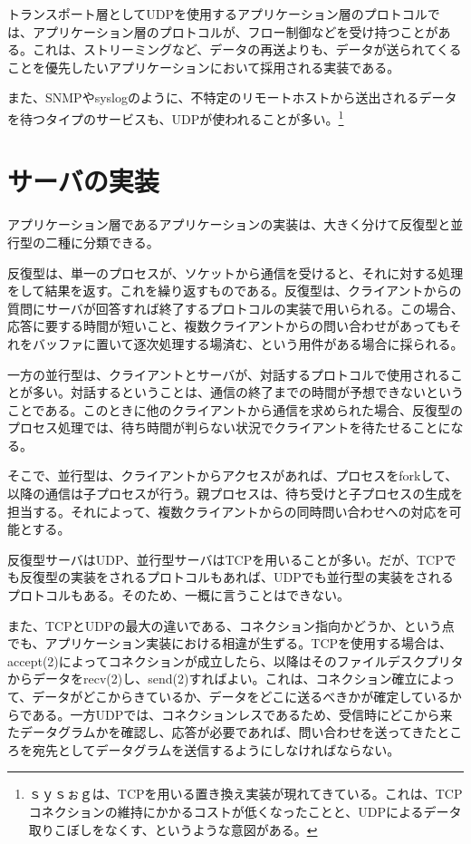 トランスポート層としてUDPを使用するアプリケーション層のプロトコルでは、アプリケーション層のプロトコルが、フロー制御などを受け持つことがある。これは、ストリーミングなど、データの再送よりも、データが送られてくることを優先したいアプリケーションにおいて採用される実装である。

また、SNMPやsyslogのように、不特定のリモートホストから送出されるデータを待つタイプのサービスも、UDPが使われることが多い。\footnote{ｓｙｓぉｇは、TCPを用いる置き換え実装が現れてきている。これは、TCPコネクションの維持にかかるコストが低くなったことと、UDPによるデータ取りこぼしをなくす、というような意図がある。}

\section{サーバの実装}
アプリケーション層であるアプリケーションの実装は、大きく分けて反復型と並行型の二種に分類できる。

反復型は、単一のプロセスが、ソケットから通信を受けると、それに対する処理をして結果を返す。これを繰り返すものである。反復型は、クライアントからの質問にサーバが回答すれば終了するプロトコルの実装で用いられる。この場合、応答に要する時間が短いこと、複数クライアントからの問い合わせがあってもそれをバッファに置いて逐次処理する場済む、という用件がある場合に採られる。

一方の並行型は、クライアントとサーバが、対話するプロトコルで使用されることが多い。対話するということは、通信の終了までの時間が予想できないということである。このときに他のクライアントから通信を求められた場合、反復型のプロセス処理では、待ち時間が判らない状況でクライアントを待たせることになる。

そこで、並行型は、クライアントからアクセスがあれば、プロセスをforkして、以降の通信は子プロセスが行う。親プロセスは、待ち受けと子プロセスの生成を担当する。それによって、複数クライアントからの同時問い合わせへの対応を可能とする。

反復型サーバはUDP、並行型サーバはTCPを用いることが多い。だが、TCPでも反復型の実装をされるプロトコルもあれば、UDPでも並行型の実装をされるプロトコルもある。そのため、一概に言うことはできない。

また、TCPとUDPの最大の違いである、コネクション指向かどうか、という点でも、アプリケーション実装における相違が生ずる。TCPを使用する場合は、 accept(2)によってコネクションが成立したら、以降はそのファイルデスクプリタからデータをrecv(2)し、send(2)すればよい。これは、コネクション確立によって、データがどこからきているか、データをどこに送るべきかが確定しているからである。一方UDPでは、コネクションレスであるため、受信時にどこから来たデータグラムかを確認し、応答が必要であれば、問い合わせを送ってきたところを宛先としてデータグラムを送信するようにしなければならない。

